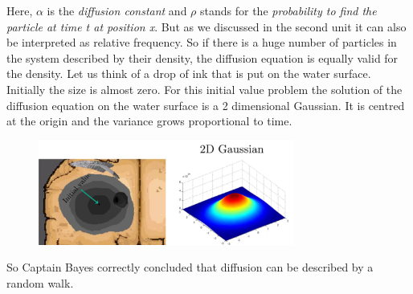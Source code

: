 \documentclass[12pt, a4paper]{scrartcl}
\begin{document}
Here, $\alpha$ is the \textit{diffusion constant} and $\rho$ stands for the \textit{probability to find the particle at time t at position x}. But as we discussed in the second unit it can also be interpreted as relative frequency. So if there is a huge number of particles in the system described by their density, the diffusion equation is equally valid for the density.
Let us think of a drop of ink that is put on the water surface. Initially the size is almost zero. 
For this initial value problem the solution of the diffusion equation on the water surface is a 2 dimensional Gaussian.
It is centred at the origin and the variance grows proportional to time.%
 \begin{figure}[H]
	\centering
	\includegraphics[width=0.75\textwidth]{5_4.png}
\end{figure}
So Captain Bayes correctly concluded that diffusion can be described by a random walk.\\
\end{document}
